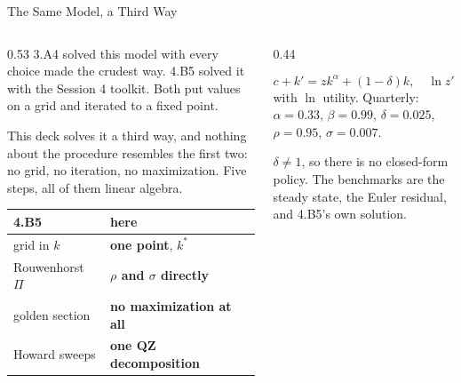 \begin{frame}{The Same Model, a Third Way}
\begin{columns}[T]
\begin{column}{0.53\textwidth}
\small
3.A4 solved this model with every choice made the crudest way. 4.B5 solved it with the Session 4 toolkit. Both put values on a grid and iterated to a fixed point.
\medskip

This deck solves it a third way, and nothing about the procedure resembles the first two: no grid, no iteration, no maximization. Five steps, all of them linear algebra.
\medskip

\begin{center}\footnotesize
\begin{tabularx}{\linewidth}{@{}>{\raggedright\arraybackslash}p{1.6cm} >{\raggedright\arraybackslash}X@{}}
\toprule
\textbf{4.B5} & \textbf{here} \\
\midrule
grid in $k$ & \textbf{one point}, $k^{*}$ \\
Rouwenhorst $\Pi$ & \textbf{$\rho$ and $\sigma$ directly} \\
golden section & \textbf{no maximization at all} \\
Howard sweeps & \textbf{one QZ decomposition} \\
\bottomrule
\end{tabularx}
\end{center}
\end{column}
\begin{column}{0.44\textwidth}
\begin{conceptbox}[title=\textbf{The model}]\small
\[
  c+k'=zk^{\alpha}+(1-\delta)k,\quad \ln z'=\rho\ln z+\sigma\varepsilon'
\]
with $\ln$ utility. Quarterly: $\alpha=0.33$, $\beta=0.99$, $\delta=0.025$, $\rho=0.95$, $\sigma=0.007$.
\end{conceptbox}
\medskip
\begin{examplebox}\footnotesize
$\delta\neq1$, so there is no closed-form policy. The benchmarks are the steady state, the Euler residual, and 4.B5's own solution.
\end{examplebox}
\end{column}
\end{columns}
\end{frame}

